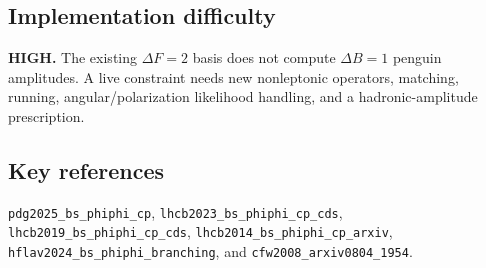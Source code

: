 \subsection*{Implementation difficulty}
\textbf{HIGH.}  The existing \(\Delta F=2\) basis does not compute
\(\Delta B=1\) penguin amplitudes.  A live constraint needs new nonleptonic
operators, matching, running, angular/polarization likelihood handling, and a
hadronic-amplitude prescription.

\subsection*{Key references}
\texttt{pdg2025\_bs\_phiphi\_cp},
\texttt{lhcb2023\_bs\_phiphi\_cp\_cds},
\texttt{lhcb2019\_bs\_phiphi\_cp\_cds},
\texttt{lhcb2014\_bs\_phiphi\_cp\_arxiv},
\texttt{hflav2024\_bs\_phiphi\_branching}, and
\texttt{cfw2008\_arxiv0804\_1954}.
